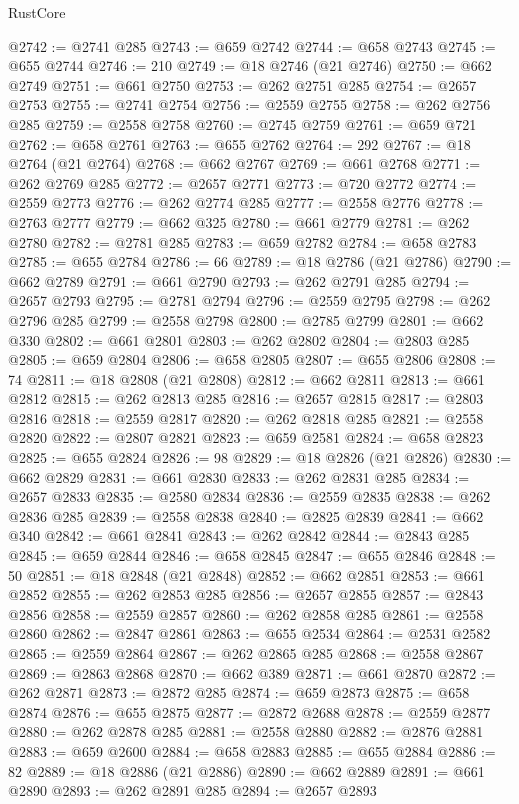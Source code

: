 \begin{lexlean}{RustCore}
\begin{coremodule}
@2742 := @2741 @285
@2743 := @659 @2742
@2744 := @658 @2743
@2745 := @655 @2744
@2746 := 210
@2749 := @18 @2746 (@21 @2746)
@2750 := @662 @2749
@2751 := @661 @2750
@2753 := @262 @2751 @285
@2754 := @2657 @2753
@2755 := @2741 @2754
@2756 := @2559 @2755
@2758 := @262 @2756 @285
@2759 := @2558 @2758
@2760 := @2745 @2759
@2761 := @659 @721
@2762 := @658 @2761
@2763 := @655 @2762
@2764 := 292
@2767 := @18 @2764 (@21 @2764)
@2768 := @662 @2767
@2769 := @661 @2768
@2771 := @262 @2769 @285
@2772 := @2657 @2771
@2773 := @720 @2772
@2774 := @2559 @2773
@2776 := @262 @2774 @285
@2777 := @2558 @2776
@2778 := @2763 @2777
@2779 := @662 @325
@2780 := @661 @2779
@2781 := @262 @2780
@2782 := @2781 @285
@2783 := @659 @2782
@2784 := @658 @2783
@2785 := @655 @2784
@2786 := 66
@2789 := @18 @2786 (@21 @2786)
@2790 := @662 @2789
@2791 := @661 @2790
@2793 := @262 @2791 @285
@2794 := @2657 @2793
@2795 := @2781 @2794
@2796 := @2559 @2795
@2798 := @262 @2796 @285
@2799 := @2558 @2798
@2800 := @2785 @2799
@2801 := @662 @330
@2802 := @661 @2801
@2803 := @262 @2802
@2804 := @2803 @285
@2805 := @659 @2804
@2806 := @658 @2805
@2807 := @655 @2806
@2808 := 74
@2811 := @18 @2808 (@21 @2808)
@2812 := @662 @2811
@2813 := @661 @2812
@2815 := @262 @2813 @285
@2816 := @2657 @2815
@2817 := @2803 @2816
@2818 := @2559 @2817
@2820 := @262 @2818 @285
@2821 := @2558 @2820
@2822 := @2807 @2821
@2823 := @659 @2581
@2824 := @658 @2823
@2825 := @655 @2824
@2826 := 98
@2829 := @18 @2826 (@21 @2826)
@2830 := @662 @2829
@2831 := @661 @2830
@2833 := @262 @2831 @285
@2834 := @2657 @2833
@2835 := @2580 @2834
@2836 := @2559 @2835
@2838 := @262 @2836 @285
@2839 := @2558 @2838
@2840 := @2825 @2839
@2841 := @662 @340
@2842 := @661 @2841
@2843 := @262 @2842
@2844 := @2843 @285
@2845 := @659 @2844
@2846 := @658 @2845
@2847 := @655 @2846
@2848 := 50
@2851 := @18 @2848 (@21 @2848)
@2852 := @662 @2851
@2853 := @661 @2852
@2855 := @262 @2853 @285
@2856 := @2657 @2855
@2857 := @2843 @2856
@2858 := @2559 @2857
@2860 := @262 @2858 @285
@2861 := @2558 @2860
@2862 := @2847 @2861
@2863 := @655 @2534
@2864 := @2531 @2582
@2865 := @2559 @2864
@2867 := @262 @2865 @285
@2868 := @2558 @2867
@2869 := @2863 @2868
@2870 := @662 @389
@2871 := @661 @2870
@2872 := @262 @2871
@2873 := @2872 @285
@2874 := @659 @2873
@2875 := @658 @2874
@2876 := @655 @2875
@2877 := @2872 @2688
@2878 := @2559 @2877
@2880 := @262 @2878 @285
@2881 := @2558 @2880
@2882 := @2876 @2881
@2883 := @659 @2600
@2884 := @658 @2883
@2885 := @655 @2884
@2886 := 82
@2889 := @18 @2886 (@21 @2886)
@2890 := @662 @2889
@2891 := @661 @2890
@2893 := @262 @2891 @285
@2894 := @2657 @2893

\end{coremodule}
\end{lexlean}
